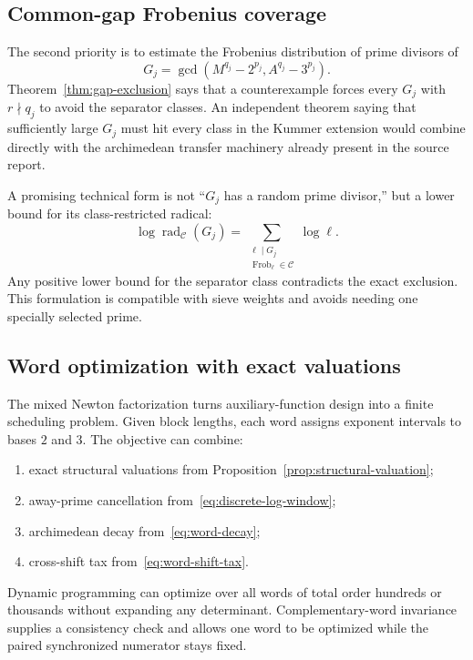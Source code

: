 \documentclass[11pt,oneside]{article}
\theoremstyle{definition}
\theoremstyle{remark}
\newcommand{\rad}{\operatorname{rad}}
\begin{document}
\subsection{Common-gap Frobenius coverage}

The second priority is to estimate the Frobenius distribution of prime divisors of
\[
 G_j=\gcd(M^{q_j}-2^{p_j},A^{q_j}-3^{p_j}).
\]
Theorem~\ref{thm:gap-exclusion} says that a counterexample forces every $G_j$ with
$r\nmid q_j$ to avoid the separator classes.  An independent theorem saying that sufficiently
large $G_j$ must hit every class in the Kummer extension would combine directly with the
archimedean transfer machinery already present in the source report.

A promising technical form is not ``$G_j$ has a random prime divisor,'' but a lower bound for
its class-restricted radical:
\begin{equation}
 \log\rad_{\mathcal C}(G_j)
 =\sum_{\substack{\ell\mid G_j\\\operatorname{Frob}_\ell\in\mathcal C}}\log\ell.
 \label{eq:class-restricted-radical}
\end{equation}
Any positive lower bound for the separator class contradicts the exact exclusion.  This
formulation is compatible with sieve weights and avoids needing one specially selected prime.

\subsection{Word optimization with exact valuations}

The mixed Newton factorization turns auxiliary-function design into a finite scheduling
problem.  Given block lengths, each word assigns exponent intervals to bases $2$ and $3$.
The objective can combine:
\begin{enumerate}
\item exact structural valuations from Proposition~\ref{prop:structural-valuation};
\item away-prime cancellation from~\eqref{eq:discrete-log-window};
\item archimedean decay from~\eqref{eq:word-decay};
\item cross-shift tax from~\eqref{eq:word-shift-tax}.
\end{enumerate}
Dynamic programming can optimize over all words of total order hundreds or thousands without
expanding any determinant.  Complementary-word invariance supplies a consistency check and
allows one word to be optimized while the paired synchronized numerator stays fixed.
\end{document}
